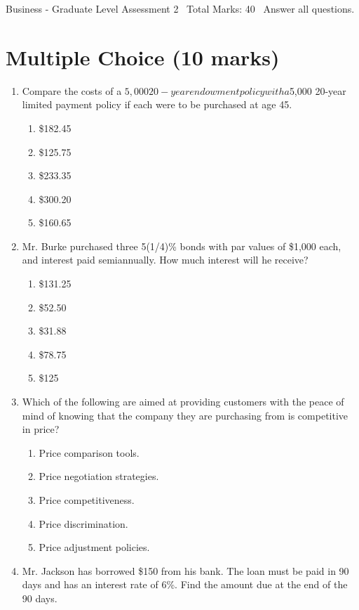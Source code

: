 \documentclass[12pt]{article}
\begin{document}
\begin{center}
Business - Graduate Level Assessment 2 \
Total Marks: 40 \
Answer all questions.
\end{center}

\section*{Multiple Choice (10 marks)}
\begin{enumerate}[label=\arabic*.]
\item Compare the costs of a $5,000 20-year endowment policy with a $5,000 20-year limited
payment policy if each were to be purchased at age 45.
\begin{enumerate}[label=(\alph*)]
    \item \$182.45
    \item \$125.75
    \item \$233.35
    \item \$300.20
    \item \$160.65
\end{enumerate}
\item Mr. Burke purchased three 5(1/4)\% bonds with par values of \$1,000 each, and interest paid
semiannually. How much interest will he receive?
\begin{enumerate}[label=(\alph*)]
    \item \$131.25
    \item \$52.50
    \item \$31.88
    \item \$78.75
    \item \$125
\end{enumerate}
\item Which of the following are aimed at providing customers with the peace of mind of knowing
that the company they are purchasing from is competitive in price?
\begin{enumerate}[label=(\alph*)]
    \item Price comparison tools.
    \item Price negotiation strategies.
    \item Price competitiveness.
    \item Price discrimination.
    \item Price adjustment policies.
\end{enumerate}
\item Mr. Jackson has borrowed \$150 from his bank. The loan must be paid in 90 days and has an
interest rate of 6\%. Find the amount due at the end of the 90 days.

\end{enumerate}
\end{document}
